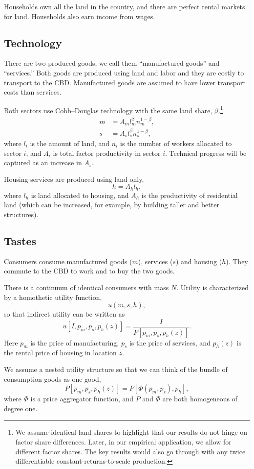 \documentclass[12pt]{article}
\begin{document}
Households own all the land in the country, and there are perfect rental markets for land. Households also earn income from wages.

\subsection{Technology}
There are two produced goods, we call them ``manufactured goods'' and ``services.'' Both goods are produced using land and labor and they are costly to transport to the CBD. Manufactured goods are assumed to have lower transport costs than services.

Both sectors use Cobb--Douglas technology with the same land share, $\beta$.\footnote{We assume identical land shares to highlight that our results do not hinge on factor share differences. Later, in our empirical application, we allow for different factor shares. The key results would also go through with any twice differentiable constant-returns-to-scale production.}
\begin{align*}
m&=A_ml_m^\beta n_m^{1-\beta},\\
s&=A_sl_s^\beta n_s^{1-\beta},
\end{align*}
where $l_i$ is the amount of land, and $n_i$ is the number of workers allocated to sector $i$, and $A_i$ is total factor productivity in sector $i$. Technical progress will be captured as an increase in $A_i$.

Housing services are produced using land only,
\[
 h=A_hl_h,
\]
where $l_h$ is land allocated to housing, and $A_h$ is the productivity of residential land (which can be increased, for example, by building taller and better structures).

\subsection{Tastes}
Consumers consume manufactured goods ($m$), services ($s$) and housing ($h$). They commute to the CBD to work and to buy the two goods.

There is a continuum of identical consumers with mass $N$. Utility is characterized by a homothetic utility function,
\[
u(m,s,h),
\]
so that indirect utility can be written as
\[
u[I, p_m,p_s,p_h(z)] = \frac{I}{P[p_m,p_s,p_h(z)]}.
\]
Here $p_m$ is the price of manufacturing, $p_s$ is the price of services, and $p_h(z)$ is the rental price of housing in location $z$.

We assume a nested utility structure so that we can think of the bundle of consumption goods as one good,
    \[
P[p_m,p_s,p_h(z)] = P[\Phi(p_m,p_s),p_h],
    \]
where $\Phi$ is a price aggregator function, and $P$ and $\Phi$ are both homogeneous of degree one.
\end{document}
